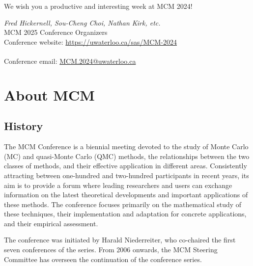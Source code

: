 We wish you a productive and interesting week at MCM 2024!


\bigskip
\emph{Fred Hickernell, Sou-Cheng Choi, Nathan Kirk, etc.} \\
MCM 2025 Conference Organizers \\




\vspace{5cm}
Conference website: \url{https://uwaterloo.ca/sas/MCM-2024} \\
\\
Conference email: \url{MCM.2024@uwaterloo.ca}

\thispagestyle{empty} \tableofcontents

\section{About MCM}

\subsection{History}

The MCM Conference is a biennial meeting devoted to the study of Monte
Carlo (MC) and quasi-Monte Carlo (QMC) methods, the relationships between
the two classes of methods, and their effective application in different
areas. Consistently attracting between one-hundred and two-hundred participants in recent years, its aim
is to provide a forum where leading researchers and users can exchange
information on the latest theoretical developments and important
applications of these methods. The conference focuses primarily
on the mathematical study of these techniques, their implementation and
adaptation for concrete applications, and their empirical assessment.

The conference was initiated by Harald Niederreiter, who co-chaired the
first seven conferences of the series. From 2006 onwards, the MCM Steering Committee has
overseen the continuation of the conference series.

